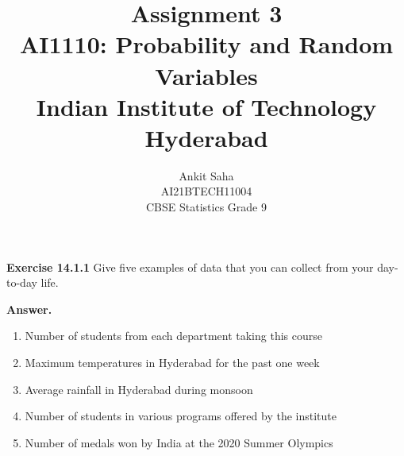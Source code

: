 \documentclass[journal,12pt,twocolumn]{IEEEtran}
\title{Assignment 3 \\ \Large AI1110: Probability and Random Variables \\ \large Indian Institute of Technology Hyderabad}
\author{Ankit Saha \\ \normalsize AI21BTECH11004 \\ \vspace*{20pt} \Large CBSE Statistics Grade 9}
\begin{document}
	\maketitle
	
	\textbf{Exercise 14.1.1} 
	Give five examples of data that you can collect from your day-to-day life.
	
	\textbf{Answer.}		
	\begin{enumerate}[label=\roman*)]
	\item Number of students from each department taking this course
	\begin{table}[ht!]
		\centering
		
		\caption{}
		\label{table:table1}	
	\end{table}
	
	\item Maximum temperatures in Hyderabad for the past one week
	\begin{table}[ht!]
		\centering
		
		\caption{}
		\label{table:table2}	
	\end{table}
	
	\item Average rainfall in Hyderabad during monsoon
	\begin{table}[ht!]
		\centering
		
		\caption{}
		\label{table:table3}	
	\end{table}
	
	\item Number of students in various programs offered by the institute
	\begin{table}[ht!]
		\centering
		
		\caption{}
		\label{table:table4}	
	\end{table}
	
	
	\item Number of medals won by India at the 2020 Summer Olympics
	\begin{table}[ht!]
		\centering
		
		\caption{}
		\label{table:table5}	
	\end{table}
	
	\end{enumerate}
	
\end{document}
